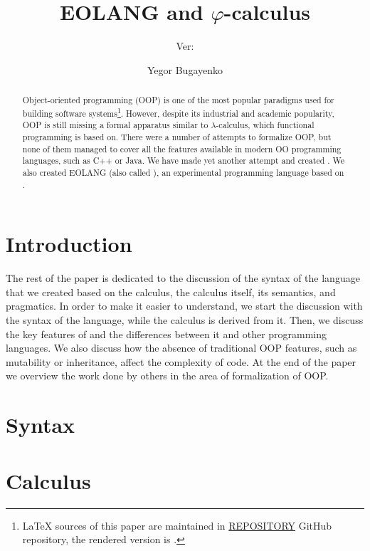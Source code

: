 \documentclass[sigplan,nonacm,natbib=false]{acmart}
\title{EOLANG and \texorpdfstring{\(\varphi\)}{phi}-calculus}
\subtitle{%
  Ver:
  \texorpdfstring{
    \href{https://github.com/REPOSITORY/releases/tag/0.0.0}
      {\ff{0.0.0}}
  }{0.0.0}
}
\author{Yegor Bugayenko}
\affiliation{
  \institution{Huawei}
  \city{Moscow}
  \country{Russia}
}
\begin{document}
\begin{abstract}
Object-oriented programming (OOP) is one of the most popular
paradigms used for building software systems\footnote{%
  \LaTeX{} sources of this paper are maintained in
  \href{https://github.com/REPOSITORY}{REPOSITORY} GitHub repository,
  the rendered version is \href{https://github.com/REPOSITORY/releases/tag/0.0.0}{}.}.
However, despite
its industrial and academic popularity, OOP is still missing
a formal apparatus similar to \(\lambda\)-calculus, which functional
programming is based on. There were a number of attempts to formalize
OOP, but none of them managed to cover all the features available in
modern OO programming languages, such as C++ or Java.
We have made yet another attempt and created \phic{}. We also
created EOLANG (also called \eolang{}), an experimental
programming language based on \phic{}.
\end{abstract}

\maketitle

\section{Introduction}
\label{sec:intro}



The rest of the paper is dedicated to the discussion of the
syntax of the language that we created based on the calculus,
the calculus itself, its semantics, and pragmatics.
In order to make it easier to understand, we start
the discussion with the syntax of the language, while the calculus
is derived from it. Then, we discuss the
key features of \eolang{} and the differences between it and other
programming languages. We also discuss how the absence of traditional
OOP features, such as mutability or inheritance, affect the complexity of code.
At the end of the paper we overview the work done by others in the area of
formalization of OOP.

\section{Syntax}
\label{sec:syntax}


\section{Calculus}
\label{sec:calculus}

\end{document}
